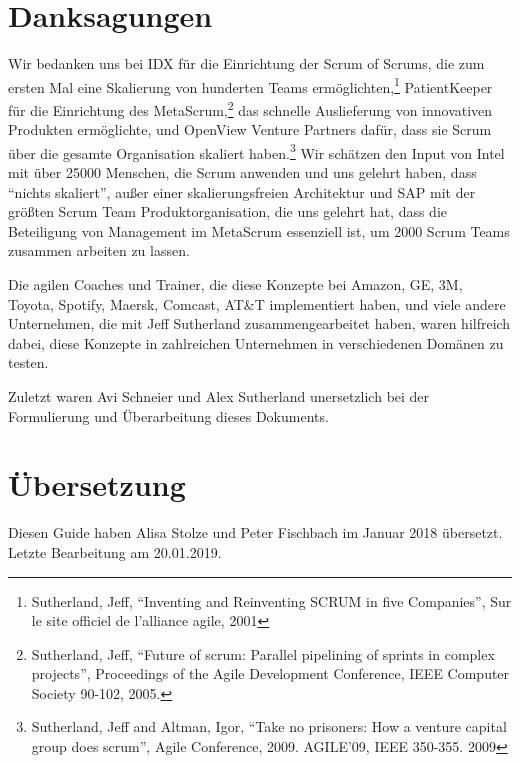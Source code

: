 \documentclass[12pt,a4paper,parskip=full]{scrartcl}
\begin{document}
\section{Danksagungen}
Wir bedanken uns bei IDX für die Einrichtung der Scrum of Scrums, die zum ersten
Mal eine Skalierung von hunderten Teams ermöglichten,\footnote{Sutherland, Jeff,
``Inventing and Reinventing SCRUM in five Companies'', Sur le site officiel
de l'alliance agile, 2001} PatientKeeper für die Einrichtung des
MetaScrum,\footnote{Sutherland, Jeff, ``Future of scrum: Parallel pipelining of
sprints in complex projects'', Proceedings of the Agile Development Conference,
IEEE Computer Society 90-102,  2005.} das schnelle Auslieferung von innovativen
Produkten ermöglichte, und OpenView Venture Partners dafür, dass sie Scrum über
die gesamte Organisation skaliert haben.\footnote{Sutherland, Jeff and Altman,
Igor, ``Take no prisoners: How a venture capital group does scrum'', Agile
Conference, 2009. AGILE'09, IEEE 350-355.  2009} Wir schätzen den Input von Intel
mit über 25000 Menschen, die Scrum anwenden und uns gelehrt haben, dass
``nichts skaliert'', außer einer skalierungsfreien Architektur und SAP mit der
größten Scrum Team Produktorganisation, die uns gelehrt hat, dass die
Beteiligung von Management im MetaScrum essenziell ist, um 2000 Scrum Teams
zusammen arbeiten zu lassen.


Die agilen Coaches und Trainer, die diese Konzepte bei Amazon, GE, 3M, Toyota,
Spotify, Maersk, Comcast, AT&T implementiert haben, und viele andere Unternehmen,
die mit Jeff Sutherland zusammengearbeitet haben, waren hilfreich dabei, diese
Konzepte in zahlreichen Unternehmen in verschiedenen Domänen zu testen.

Zuletzt waren Avi Schneier und Alex Sutherland unersetzlich bei der Formulierung
und Überarbeitung dieses Dokuments.

\pagebreak

\printbibliography

\section{Übersetzung}
Diesen Guide haben Alisa Stolze und Peter Fischbach im Januar 2018 übersetzt.
Letzte Bearbeitung am 20.01.2019. 
\end{document}
